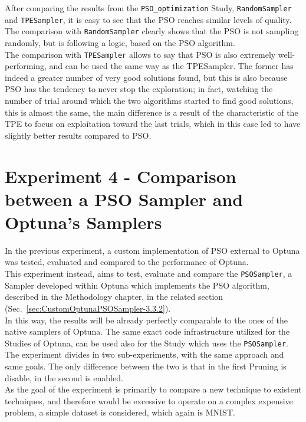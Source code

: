 After comparing the results from the \texttt{PSO\_optimization} Study, \texttt{RandomSampler} and \texttt{TPESampler}, it is easy to see that the PSO reaches similar levels of quality.
\\[0.3cm]The comparison with \texttt{RandomSampler} clearly shows that the PSO is not sampling randomly, but is following a logic, based on the PSO algorithm.
\\[0.3cm]The comparison with \texttt{TPESampler} allows to say that PSO is also extremely well-performing, and can be used the same way as the TPESampler. The former has indeed a greater number of very good solutions found, but this is also because PSO has the tendency to never stop the exploration; in fact, watching the number of trial around which the two algorithms started to find good solutions, this is almost the same, the main difference is a result of the characteristic of the TPE to focus on exploitation toward the last trials, which in this case led to have slightly better results compared to PSO.

\section{Experiment 4 - Comparison between a PSO Sampler and Optuna's Samplers}

In the previous experiment, a custom implementation of PSO external to Optuna was tested, evaluated and compared to the performance of Optuna.
\\[0.3cm]This experiment instead, aims to test, evaluate and compare the \texttt{PSOSampler}, a Sampler developed within Optuna which implements the PSO algorithm, described in the Methodology chapter, in the related section (Sec.~\ref{sec:CustomOptunaPSOSampler-3.3.2}).
\\[0.3cm]In this way, the results will be already perfectly comparable to the ones of the native samplers of Optuna. The same exact code infrastructure utilized for the Studies of Optuna, can be used also for the Study which uses the \texttt{PSOSampler}.
\\[0.3cm]The experiment divides in two sub-experiments, with the same approach and same goals. The only difference between the two is that in the first Pruning is disable, in the second is enabled.
\\[0.3cm]As the goal of the experiment is primarily to compare a new technique to existent techniques, and therefore would be excessive to operate on a complex expensive problem, a simple dataset is considered, which again is MNIST.

